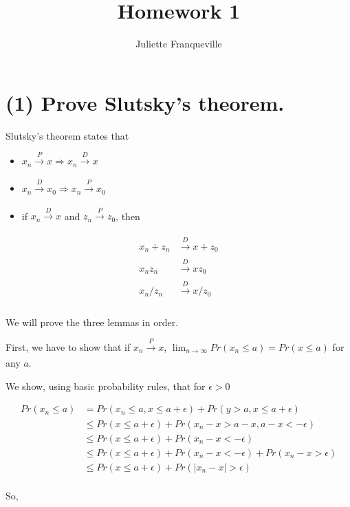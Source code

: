 \documentclass[11pt]{article}
\begin{document}
 
\title{Homework 1}
\author{Juliette Franqueville\\
}
\maketitle

\section*{(1) Prove Slutsky's theorem.}

Slutsky's theorem states that 

\begin{itemize}
\item $x_n \xrightarrow[]{P} x \Rightarrow x_n \xrightarrow[]{D} x$
\item $x_n \xrightarrow[]{D} x_0 \Rightarrow x_n \xrightarrow[]{P} x_0$
    \item if $x_n \xrightarrow[]{D} x$ and $z_n \xrightarrow[]{P} z_0$, then 
\end{itemize}
 
\begin{align*}
    x_n +z_n &\xrightarrow[]{D} x+z_0\\
    x_n z_n &\xrightarrow[]{D} xz_0\\
    x_n / z_n &\xrightarrow[]{D} x/z_0\\
\end{align*}

We will prove the three lemmas in order. 

First, we have to show that if $x_n \xrightarrow[]{P} x$,   $\lim_{n \to \infty }Pr(x_n \leq a)  = Pr(x \leq a)$ for any $a$. 


We show, using basic probability rules, that for $\epsilon > 0$

\begin{align*}
Pr(x_n \leq a) &= Pr(x_n \leq a, x \leq a + \epsilon) + Pr(y > a, x \leq a + \epsilon)\\
& \leq Pr(x \leq a + \epsilon) + Pr(x_n - x > a-x, a-x<-\epsilon)\\
& \leq Pr(x \leq a + \epsilon) + Pr(x_n - x <-\epsilon)\\
& \leq Pr(x \leq a + \epsilon) + Pr(x_n - x <-\epsilon)+ Pr(x_n - x > \epsilon)\\
& \leq Pr(x \leq a + \epsilon) + Pr(|x_n - x| > \epsilon)\\
\end{align*}

So, 
\end{document}
